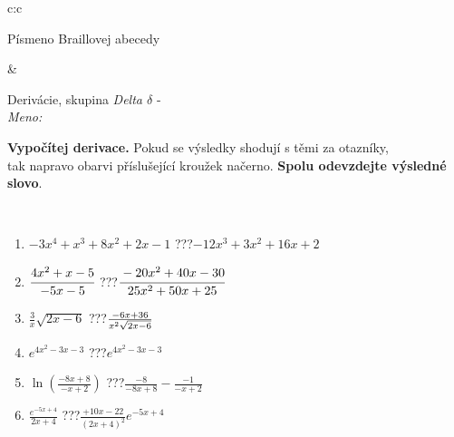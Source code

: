 \documentclass[10pt]{report}
\begin{document}
\begin{tabular}{c:c}
\begin{minipage}[c][104.5mm][t]{0.5\linewidth}
\begin{center}
\begin{minipage}{0.20\linewidth}
\begin{center}
{\small Písmeno Braillovej abecedy}
\end{center}
\end{minipage}
\end{center}
\end{minipage}
&
\begin{minipage}[c][104.5mm][t]{0.5\linewidth}
\begin{center}
\vspace{7mm}
{\huge Derivácie, skupina \textit{Delta $\delta$} -}\\[5mm]
\textit{Meno:}\phantom{xxxxxxxxxxxxxxxxxxxxxxxxxxxxxxxxxxxxxxxxxxxxxxxxxxxxxxxxxxxxxxxxx}\\[5mm]
\begin{minipage}{0.95\linewidth}
\begin{center}
\textbf{Vypočítej derivace.} Pokud se výsledky shodují s těmi za otazníky,\\tak napravo obarvi příslušející kroužek načerno. \textbf{Spolu odevzdejte výsledné slovo}.
\end{center}
\end{minipage}
\\[1mm]
\begin{minipage}{0.79\linewidth}
\begin{center}
\begin{varwidth}{\linewidth}
\begin{enumerate}
\normalsize
\item $-3x^4+x^3+8x^2+2x-1$\quad \dotfill\; ???\;\dotfill \quad $-12x^3+3x^2+16x+2$
\item $\cfrac{4x^2+x-5}{-5x-5}$\quad \dotfill\; ???\;\dotfill \quad $\cfrac{-20x^2+40x-30}{25x^2+50x+25}$
\item $\frac{3}{x}\sqrt{2x-6}$\quad \dotfill\; ???\;\dotfill \quad $\frac{-6x+36}{x^2 \sqrt{\smash[b]{2x-6}}}$
\item $e^{4x^2-3x-3}$\quad \dotfill\; ???\;\dotfill \quad $e^{4x^2-3x-3}$
\item $\ln{\left(\frac{-8x+8}{-x+2}\right)}$\quad \dotfill\; ???\;\dotfill \quad $\frac{-8}{-8x+8}-\frac{-1}{-x+2}$
\item $\frac{e^{-5x+4}}{2x+4}$\quad \dotfill\; ???\;\dotfill \quad $\frac{+10x-22}{(2x+4)^2}e^{-5x+4}$
\end{enumerate}
\end{varwidth}
\end{center}
\end{minipage}
\begin{minipage}{0.20\linewidth}
\begin{center}

\end{center}
\end{minipage}
\end{center}
\end{minipage}
\end{tabular}
\end{document}

